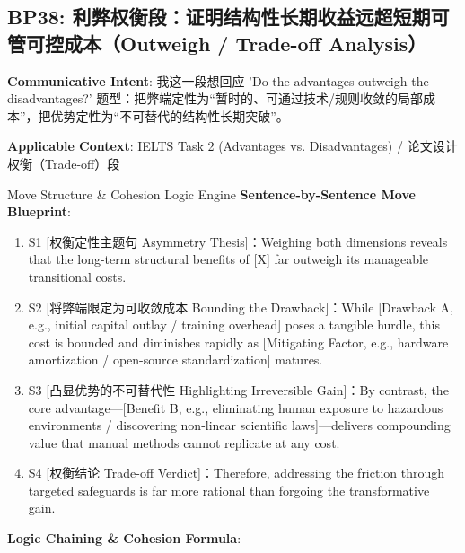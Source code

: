 \subsection{BP38: 利弊权衡段：证明结构性长期收益远超短期可管可控成本（Outweigh / Trade-off Analysis）}\label{sec:bp:BP38}
\noindent\textbf{\color{AcadNavy}Communicative Intent}: 我这一段想回应 'Do the advantages outweigh the disadvantages?' 题型：把弊端定性为“暂时的、可通过技术/规则收敛的局部成本”，把优势定性为“不可替代的结构性长期突破”。\par\vspace{2pt}
\noindent\textbf{\color{AcadSlate}Applicable Context}: IELTS Task 2 (Advantages vs. Disadvantages) / 论文设计权衡（Trade-off）段\par\vspace{4pt}
\begin{ConceptBox}{Move Structure \& Cohesion Logic Engine}
\textbf{Sentence-by-Sentence Move Blueprint}:
\begin{enumerate}[label=\textbf{\color{AcadNavy}S\arabic*.}, leftmargin=2em, itemsep=2pt]
  \item S1 [权衡定性主题句 Asymmetry Thesis]：Weighing both dimensions reveals that the long-term structural benefits of [X] far outweigh its manageable transitional costs.
  \item S2 [将弊端限定为可收敛成本 Bounding the Drawback]：While [Drawback A, e.g., initial capital outlay / training overhead] poses a tangible hurdle, this cost is bounded and diminishes rapidly as [Mitigating Factor, e.g., hardware amortization / open-source standardization] matures.
  \item S3 [凸显优势的不可替代性 Highlighting Irreversible Gain]：By contrast, the core advantage---[Benefit B, e.g., eliminating human exposure to hazardous environments / discovering non-linear scientific laws]---delivers compounding value that manual methods cannot replicate at any cost.
  \item S4 [权衡结论 Trade-off Verdict]：Therefore, addressing the friction through targeted safeguards is far more rational than forgoing the transformative gain.
\end{enumerate}\par\vspace{4pt}
\textbf{Logic Chaining \& Cohesion Formula}:\par{}
\end{ConceptBox}
